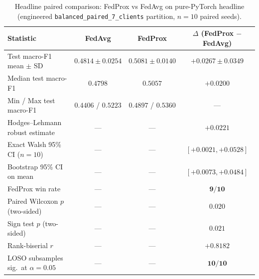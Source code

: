 \begin{table}[!htbp]
\centering
\small
\caption{Headline paired comparison: FedProx vs FedAvg on pure-PyTorch headline (engineered \texttt{balanced\_paired\_7\_clients} partition, $n = 10$ paired seeds).}
\label{tab:headline-summary}
\begin{tabular}{l c c c}
\toprule
Statistic & FedAvg & FedProx & $\Delta$ (FedProx $-$ FedAvg) \\
\midrule
Test macro-F1 mean $\pm$ SD & $0.4814 \pm 0.0254$ & $0.5081 \pm 0.0140$ & $\mathbf{+0.0267 \pm 0.0349}$ \\
Median test macro-F1            & $0.4798$ & $0.5057$ & $+0.0200$ \\
Min / Max test macro-F1         & $0.4406$ / $0.5223$ & $0.4897$ / $0.5360$ & --- \\
Hodges--Lehmann robust estimate & --- & --- & $+0.0221$ \\
Exact Walsh 95\% CI ($n=10$)    & --- & --- & $[+0.0021, +0.0528]$ \\
Bootstrap 95\% CI on mean       & --- & --- & $[+0.0073, +0.0484]$ \\
FedProx win rate                & --- & --- & $\mathbf{9/10}$ \\
Paired Wilcoxon $p$ (two-sided) & --- & --- & $\mathbf{0.020}$ \\
Sign test $p$ (two-sided)       & --- & --- & $0.021$ \\
Rank-biserial $r$               & --- & --- & $+0.8182$ \\
LOSO subsamples sig.\ at $\alpha = 0.05$ & --- & --- & $\mathbf{10/10}$ \\
\bottomrule
\end{tabular}
\end{table}
